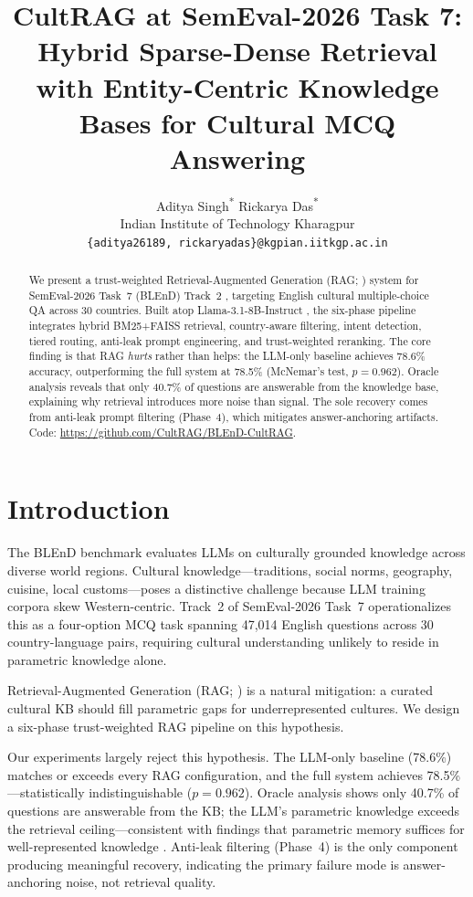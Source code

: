 \documentclass[11pt,a4paper]{article}
\title{\textbf{CultRAG at SemEval-2026 Task 7: Hybrid Sparse-Dense Retrieval with Entity-Centric Knowledge Bases for Cultural MCQ Answering}}
\author{
  Aditya Singh\textsuperscript{*} \quad Rickarya Das\textsuperscript{*} \\
  Indian Institute of Technology Kharagpur \\
  \texttt{\{aditya26189, rickaryadas\}@kgpian.iitkgp.ac.in}
}
\begin{document}
\maketitle
\raggedbottom

\begin{abstract}
\sloppy
We present a trust-weighted Retrieval-Augmented Generation (RAG; \citealp{lewis2020rag}) system for SemEval-2026 Task~7 (BLEnD) Track~2 \cite{task7_overview}, targeting English cultural multiple-choice QA across 30 countries. Built atop Llama-3.1-8B-Instruct \cite{meta2024llama}, the six-phase pipeline integrates hybrid BM25+FAISS retrieval, country-aware filtering, intent detection, tiered routing, anti-leak prompt engineering, and trust-weighted reranking. The core finding is that RAG \emph{hurts} rather than helps: the LLM-only baseline achieves 78.6\% accuracy, outperforming the full system at 78.5\% (McNemar's test, $p = 0.962$). Oracle analysis reveals that only 40.7\% of questions are answerable from the knowledge base, explaining why retrieval introduces more noise than signal. The sole recovery comes from anti-leak prompt filtering (Phase~4), which mitigates answer-anchoring artifacts. Code: \url{https://github.com/CultRAG/BLEnD-CultRAG}.
\end{abstract}

\section{Introduction}

The BLEnD benchmark \cite{blend2026task,task7_overview} evaluates LLMs on culturally grounded knowledge across diverse world regions. Cultural knowledge---traditions, social norms, geography, cuisine, local customs---poses a distinctive challenge because LLM training corpora skew Western-centric. Track~2 of SemEval-2026 Task~7 operationalizes this as a four-option MCQ task spanning 47,014 English questions across 30 country-language pairs, requiring cultural understanding unlikely to reside in parametric knowledge alone.

Retrieval-Augmented Generation (RAG; \citealp{lewis2020rag}) is a natural mitigation: a curated cultural KB should fill parametric gaps for underrepresented cultures. We design a six-phase trust-weighted RAG pipeline on this hypothesis.

Our experiments largely reject this hypothesis. The LLM-only baseline (78.6\%) matches or exceeds every RAG configuration, and the full system achieves 78.5\%---statistically indistinguishable ($p = 0.962$). Oracle analysis shows only 40.7\% of questions are answerable from the KB; the LLM's parametric knowledge exceeds the retrieval ceiling---consistent with findings that parametric memory suffices for well-represented knowledge \cite{mallen2023trust}. Anti-leak filtering (Phase~4) is the only component producing meaningful recovery, indicating the primary failure mode is answer-anchoring noise, not retrieval quality.
\end{document}
